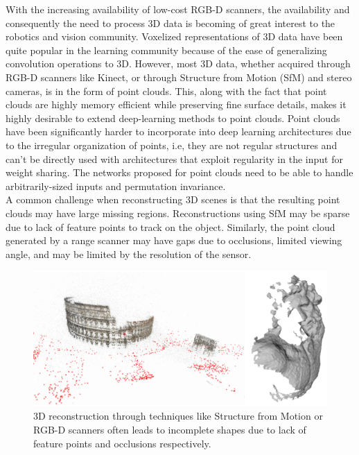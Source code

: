 \documentclass[10pt,twocolumn,letterpaper]{article}
\begin{document}
With the increasing availability of low-cost RGB-D scanners, the availability and consequently the need to process 3D data is becoming of great interest to the robotics and vision community. Voxelized representations of 3D data have been quite popular in the learning community because of the ease of generalizing convolution operations to 3D. However, most 3D data, whether acquired through RGB-D scanners like Kinect, or through Structure from Motion (SfM) and stereo cameras, is in the form of point clouds. This, along with the fact that point clouds are highly memory efficient while preserving fine surface details, makes it highly desirable to extend deep-learning methods to point clouds. 
Point clouds have been significantly harder to incorporate into deep learning architectures due to the irregular organization of points, i.e, they are not regular structures and can't be directly used with architectures that exploit regularity in the input for weight sharing. The networks proposed for point clouds need to be able to handle arbitrarily-sized inputs and permutation invariance.\\
A common challenge when reconstructing 3D scenes is that the resulting point clouds may have large missing regions. Reconstructions using SfM may be sparse due to lack of feature points to track on the object. Similarly, the point cloud generated by a range scanner may have gaps due to occlusions, limited viewing angle, and may be limited by the resolution of the sensor.
\setlength{\belowdisplayskip}{0pt} \setlength{\belowdisplayshortskip}{0pt}
\setlength{\abovedisplayskip}{0pt} \setlength{\abovedisplayshortskip}{0pt}
\begin{figure}[H]
\begin{center}
   \includegraphics[width=1\linewidth]{sfm.png}
\end{center}
   \caption{3D reconstruction through techniques like Structure from Motion or RGB-D scanners often leads to incomplete shapes due to lack of feature points and occlusions respectively.}
\label{fig:rome}
\end{figure}
\end{document}
